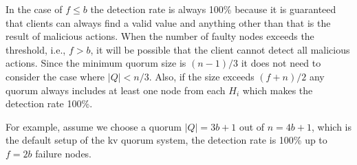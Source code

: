 In the case of $f \le b$ the detection rate is always 100\% because it is
guaranteed that clients can always find a valid value and anything
other than that is the result of malicious actions. When the number of
faulty nodes exceeds the threshold, i.e., $f > b$, it will be possible that
the client cannot detect all malicious actions. Since the minimum
quorum size is $(n-1)/3$ it does not need to consider the case where
$|Q| < n/3$. Also, if the size exceeds $(f+n)/2$ any quorum always
includes at least one node from each $H_i$ which makes the detection
rate 100\%.

\ifdefined\ABSTRACT
\else
{}
\fi

For example, assume we choose a quorum $|Q| = 3b+1$ out of $n = 4b+1$,
which is the default setup of the kv quorum system, the detection rate
is 100\% up to $f = 2b$ failure nodes.

\ifdefined\ABSTRACT
\else
{}
\fi
